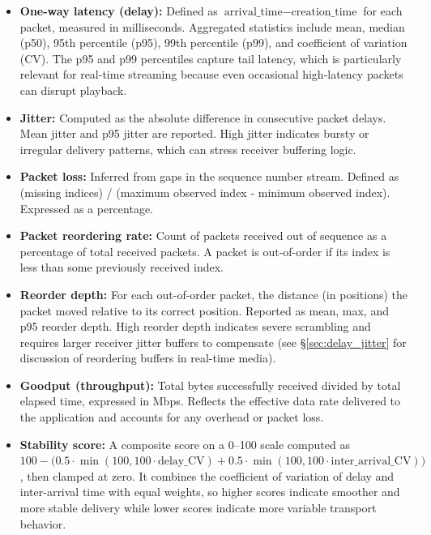 \begin{itemize}
    \item \textbf{One-way latency (delay):} Defined as $\text{arrival\_time} - \text{creation\_time}$ for each packet, measured in milliseconds. Aggregated statistics include mean, median (p50), 95th percentile (p95), 99th percentile (p99), and coefficient of variation (CV). The p95 and p99 percentiles capture tail latency, which is particularly relevant for real-time streaming because even occasional high-latency packets can disrupt playback.
    
    \item \textbf{Jitter:} Computed as the absolute difference in consecutive packet delays. Mean jitter and p95 jitter are reported. High jitter indicates bursty or irregular delivery patterns, which can stress receiver buffering logic.
    
    \item \textbf{Packet loss:} Inferred from gaps in the sequence number stream. Defined as (missing indices) / (maximum observed index - minimum observed index). Expressed as a percentage.
    
    \item \textbf{Packet reordering rate:} Count of packets received out of sequence as a percentage of total received packets. A packet is out-of-order if its index is less than some previously received index.
    
    \item \textbf{Reorder depth:} For each out-of-order packet, the distance (in positions) the packet moved relative to its correct position. Reported as mean, max, and p95 reorder depth. High reorder depth indicates severe scrambling and requires larger receiver jitter buffers to compensate (see \S\ref{sec:delay_jitter} for discussion of reordering buffers in real-time media).
    
    \item \textbf{Goodput (throughput):} Total bytes successfully received divided by total elapsed time, expressed in Mbps. Reflects the effective data rate delivered to the application and accounts for any overhead or packet loss.
    
    \item \textbf{Stability score:} A composite score on a 0--100 scale computed as $100 - \bigl(0.5 \cdot \min(100, 100 \cdot \text{delay\_CV}) + 0.5 \cdot \min(100, 100 \cdot \text{inter\_arrival\_CV})\bigr)$, then clamped at zero. It combines the coefficient of variation of delay and inter-arrival time with equal weights, so higher scores indicate smoother and more stable delivery while lower scores indicate more variable transport behavior.
    

\end{itemize}
